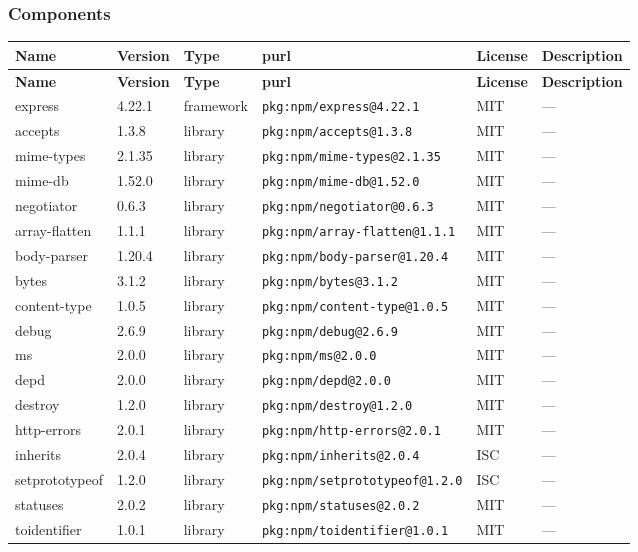 \documentclass[11pt]{article}
\begin{document}
\subsubsection*{Components}
\begin{longtable}{|l|l|l|p{2.2cm}|l|p{4cm}|}
\hline
\textbf{Name} & \textbf{Version} & \textbf{Type} & \textbf{purl} & \textbf{License} & \textbf{Description} \\
\hline
\endfirsthead
\hline
\textbf{Name} & \textbf{Version} & \textbf{Type} & \textbf{purl} & \textbf{License} & \textbf{Description} \\
\hline
\endhead
express & 4.22.1 & framework & \texttt{pkg:npm/express@4.22.1} & MIT & — \\
accepts & 1.3.8 & library & \texttt{pkg:npm/accepts@1.3.8} & MIT & — \\
mime-types & 2.1.35 & library & \texttt{pkg:npm/mime-types@2.1.35} & MIT & — \\
mime-db & 1.52.0 & library & \texttt{pkg:npm/mime-db@1.52.0} & MIT & — \\
negotiator & 0.6.3 & library & \texttt{pkg:npm/negotiator@0.6.3} & MIT & — \\
array-flatten & 1.1.1 & library & \texttt{pkg:npm/array-flatten@1.1.1} & MIT & — \\
body-parser & 1.20.4 & library & \texttt{pkg:npm/body-parser@1.20.4} & MIT & — \\
bytes & 3.1.2 & library & \texttt{pkg:npm/bytes@3.1.2} & MIT & — \\
content-type & 1.0.5 & library & \texttt{pkg:npm/content-type@1.0.5} & MIT & — \\
debug & 2.6.9 & library & \texttt{pkg:npm/debug@2.6.9} & MIT & — \\
ms & 2.0.0 & library & \texttt{pkg:npm/ms@2.0.0} & MIT & — \\
depd & 2.0.0 & library & \texttt{pkg:npm/depd@2.0.0} & MIT & — \\
destroy & 1.2.0 & library & \texttt{pkg:npm/destroy@1.2.0} & MIT & — \\
http-errors & 2.0.1 & library & \texttt{pkg:npm/http-errors@2.0.1} & MIT & — \\
inherits & 2.0.4 & library & \texttt{pkg:npm/inherits@2.0.4} & ISC & — \\
setprototypeof & 1.2.0 & library & \texttt{pkg:npm/setprototypeof@1.2.0} & ISC & — \\
statuses & 2.0.2 & library & \texttt{pkg:npm/statuses@2.0.2} & MIT & — \\
toidentifier & 1.0.1 & library & \texttt{pkg:npm/toidentifier@1.0.1} & MIT & — \\

\end{longtable}
\end{document}
